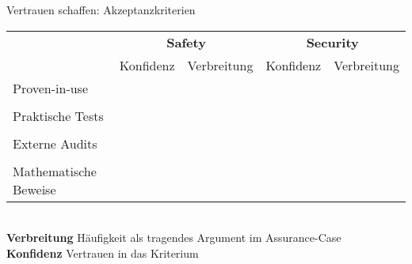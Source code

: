 \begin{frame}[T]{Vertrauen schaffen: Akzeptanzkriterien}
    \begin{tabular}{lrlrl}
      \multirow{2}{*}{}
                          & \multicolumn{2}{c}{\bfseries Safety} & \multicolumn{2}{c}{\bfseries Security} \\[0.2em]
                          &      Konfidenz     &  Verbreitung    &  Konfidenz          &  Verbreitung     \\[0.9em]

    \arrayrulecolor{lightgray}

    Proven-in-use         & \Level{++}     & \Level{+}       & \Level{-}           & \Level{+}            \\[-0.10em]
    \midrule                                                                                              \\[-1.20em]
    Praktische Tests      & \Level{+++}    & \Level{+++}     & \Level{+}           & \Level{++}           \\[-0.10em]
    \midrule                                                                                              \\[-1.20em]
    Externe Audits        & \Level{++}     & \Level{+++}     & \Level{+++}         & \Level{+++}          \\[-0.10em]
    \midrule                                                                                              \\[-1.20em]
    Mathematische Beweise & \Level{+++}    & \Level{-}       & \Level{+++}         & \Level{++}           \\[-0.10em]
    \end{tabular}
    \\[1em]
    \textbf{Verbreitung} Häufigkeit als tragendes Argument im Assurance-Case\\
    \textbf{Konfidenz} Vertrauen in das Kriterium




\end{frame}
